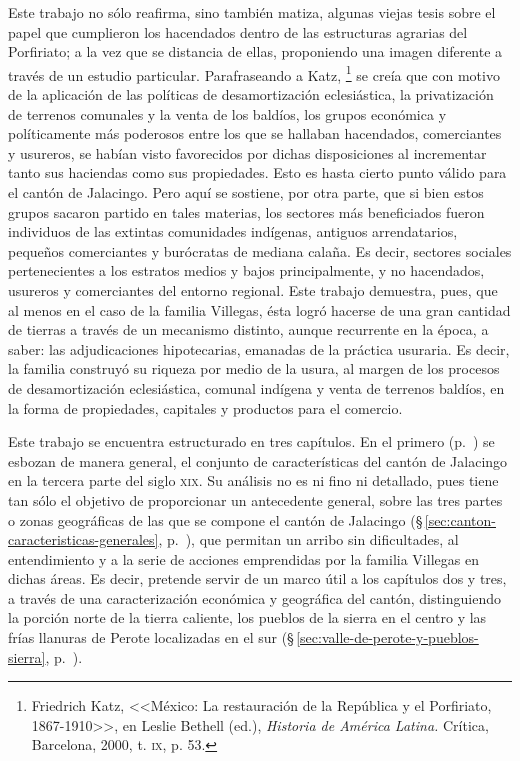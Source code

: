 \documentclass[14pt,twoside,final]{extbook} %
\let\oldfootnote\footnote
\renewcommand\footnote[1]{%
\oldfootnote{\hspace{1mm}#1}}
\begin{document}
Este trabajo no sólo reafirma, sino también matiza, algunas viejas tesis sobre el papel que cumplieron los hacendados dentro de las estructuras agrarias del Porfiriato; a la vez que se distancia de ellas, proponiendo una imagen diferente a través de un estudio particular. Parafraseando a Katz,\footnote{Friedrich Katz, <<México: La restauración de la República y el Porfiriato, 1867-1910>>, en Leslie Bethell (ed.), \emph{Historia de América Latina.} Crítica, Barcelona, 2000, t. \textsc{ix}, p. 53.} se creía que con motivo de la aplicación de las políticas de desamortización eclesiástica, la privatización de terrenos comunales y la venta de los baldíos, los grupos económica y políticamente más poderosos entre los que se hallaban hacendados, comerciantes y usureros, se habían visto favorecidos por dichas disposiciones al incrementar tanto sus haciendas como sus propiedades. Esto es hasta cierto punto válido para el cantón de Jalacingo. Pero aquí se sostiene, por otra parte, que si bien estos grupos sacaron partido en tales materias, los sectores más beneficiados fueron individuos de las extintas comunidades indígenas, antiguos arrendatarios, pequeños comerciantes y burócratas de mediana calaña. Es decir, sectores sociales pertenecientes a los estratos medios y bajos principalmente, y no hacendados, usureros y comerciantes del entorno regional. Este trabajo demuestra, pues, que al menos en el caso de la familia Villegas, ésta logró hacerse de una gran cantidad de tierras a través de un mecanismo distinto, aunque recurrente en la época, a saber: las adjudicaciones hipotecarias, emanadas de la práctica usuraria. Es decir, la familia construyó su riqueza por medio de la usura, al margen de los procesos de desamortización eclesiástica, comunal indígena y venta de terrenos baldíos, en la forma de propiedades, capitales y productos para el comercio.

Este trabajo se encuentra estructurado en tres capítulos. En el primero (p.~\pageref{ch:capitulo-uno}) se esbozan de manera general, el conjunto de características del cantón de Jalacingo en la tercera parte del siglo \textsc{xix}. Su análisis no es ni fino ni detallado, pues tiene tan sólo el objetivo de proporcionar un antecedente general, sobre las tres partes o zonas geográficas de las que se compone el cantón de Jalacingo (\S\,\ref{sec:canton-caracteristicas-generales}, p.~\pageref{sec:canton-caracteristicas-generales}), que permitan un arribo sin dificultades, al entendimiento y a la serie de acciones emprendidas por la familia Villegas en dichas áreas. Es decir, pretende servir de un marco útil a los capítulos dos y tres, a través de una caracterización económica y geográfica del cantón, distinguiendo la porción norte de la tierra caliente, los pueblos de la sierra en el centro y las frías llanuras de Perote localizadas en el sur (\S\,\ref{sec:valle-de-perote-y-pueblos-sierra}, p.~\pageref{sec:valle-de-perote-y-pueblos-sierra}).
\end{document}
